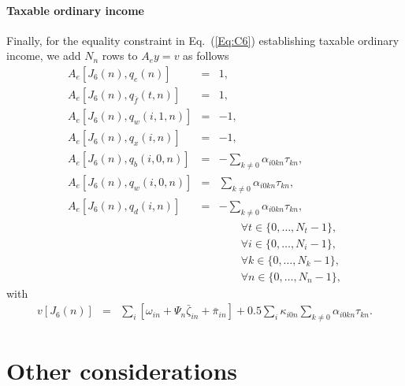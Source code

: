 \documentclass{report}[fleqn,12pt]
\begin{document}
\paragraph*{Taxable ordinary income}
Finally, for the equality constraint in Eq.~(\ref{Eq:C6}) establishing taxable
ordinary income, we add $N_n$ rows to $A_ey = v$ as follows
\begin{eqnarray}
	A_e[J_6(n), q_e(n)] &=& 1, \nonumber \\
	A_e[J_6(n), q_{\bar{f}}(t, n)] &=& 1, \nonumber \\
	A_e[J_6(n), q_w(i, 1, n)] &=& -1, \nonumber \\
	A_e[J_6(n), q_x(i, n)] &=& -1, \nonumber \\
	A_e[J_6(n), q_b(i, 0, n)] &=& -\sum_{k\neq 0} \alpha_{i0kn}\tau_{kn}, \\
	A_e[J_6(n), q_w(i, 0, n)] &=&  \sum_{k\neq 0} \alpha_{i0kn}\tau_{kn}, \nonumber \\
	A_e[J_6(n), q_d(i, n)] &=&    -\sum_{k\neq 0} \alpha_{i0kn}\tau_{kn}, \nonumber \\
	&&\qquad\forall t \in \{0,\ldots, N_t-1\},\nonumber\\
	&&\qquad\forall i \in \{0,\ldots, N_i-1\},\nonumber\\
	&&\qquad\forall k \in \{0,\ldots, N_k-1\},\nonumber\\
	&&\qquad\forall n \in \{0,\ldots, N_n-1\}, \nonumber
\end{eqnarray}
with
\begin{eqnarray}
	v[J_6(n)] &=& 
	\sum_i [\omega_{in} + \Psi_n\bar\zeta_{in}  + \bar{\pi}_{in}]
	+ 0.5\sum_{i} \kappa_{i0n} \sum_{k\neq 0} \alpha_{i0kn}\tau_{kn}.
\end{eqnarray}

\section{Other considerations}
\end{document}
